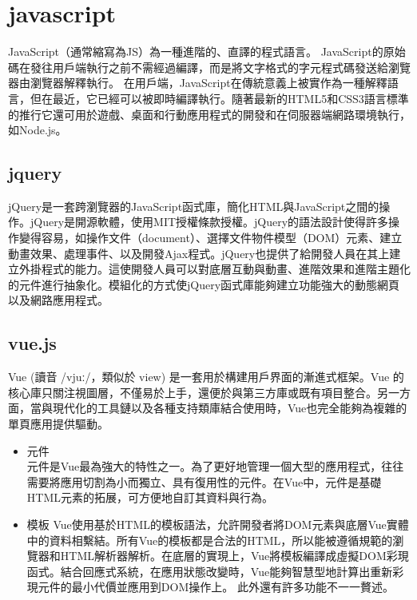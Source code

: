 \section{javascript}
JavaScript（通常縮寫為JS）為一種進階的、直譯的程式語言。
JavaScript的原始碼在發往用戶端執行之前不需經過編譯，而是將文字格式的字元程式碼發送給瀏覽器由瀏覽器解釋執行。
在用戶端，JavaScript在傳統意義上被實作為一種解釋語言，但在最近，它已經可以被即時編譯執行。隨著最新的HTML5和CSS3語言標準的推行它還可用於遊戲、桌面和行動應用程式的開發和在伺服器端網路環境執行，如Node.js。\cite{name11}

\subsection{jquery}
jQuery是一套跨瀏覽器的JavaScript函式庫，簡化HTML與JavaScript之間的操作。jQuery是開源軟體，使用MIT授權條款授權。jQuery的語法設計使得許多操作變得容易，如操作文件（document）、選擇文件物件模型（DOM）元素、建立動畫效果、處理事件、以及開發Ajax程式。jQuery也提供了給開發人員在其上建立外掛程式的能力。這使開發人員可以對底層互動與動畫、進階效果和進階主題化的元件進行抽象化。模組化的方式使jQuery函式庫能夠建立功能強大的動態網頁以及網路應用程式。\cite{name14}\cite{name15}

\subsection{vue.js}
Vue (讀音 /vjuː/，類似於 view) 是一套用於構建用戶界面的漸進式框架。Vue 的核心庫只關注視圖層，不僅易於上手，還便於與第三方庫或既有項目整合。另一方面，當與現代化的工具鏈以及各種支持類庫結合使用時，Vue也完全能夠為複雜的單頁應用提供驅動。\cite{name12}
\begin{itemize}
	\item 元件\\
	元件是Vue最為強大的特性之一。為了更好地管理一個大型的應用程式，往往需要將應用切割為小而獨立、具有復用性的元件。在Vue中，元件是基礎HTML元素的拓展，可方便地自訂其資料與行為。
	\item 模板
	Vue使用基於HTML的模板語法，允許開發者將DOM元素與底層Vue實體中的資料相繫結。所有Vue的模板都是合法的HTML，所以能被遵循規範的瀏覽器和HTML解析器解析。在底層的實現上，Vue將模板編譯成虛擬DOM彩現函式。結合回應式系統，在應用狀態改變時，Vue能夠智慧型地計算出重新彩現元件的最小代價並應用到DOM操作上。\cite{name13}
	此外還有許多功能不一一贅述。
\end{itemize}

